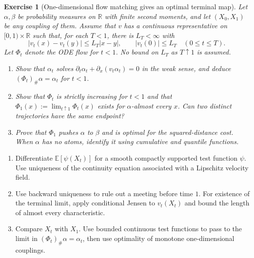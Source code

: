 \documentclass[11pt,a4paper]{article}
\theoremstyle{exostyle}
\newtheorem{exercise}{Exercise}
\newcommand{\R}{\mathbb{R}}
\newcommand{\push}{\#}
\newcommand{\EE}{\mathbb{E}}
\begin{document}
\begin{exercise}[One-dimensional flow matching gives an optimal terminal map]\label{ex-fm-line}
Let $\alpha,\beta$ be probability measures on $\R$ with finite second
moments, and let $(X_0,X_1)$ be any coupling of them.
Assume that $v$ has a continuous representative on $[0,1)\times\R$ such
that, for each $T<1$, there is $L_T<\infty$ with
\[
  |v_t(x)-v_t(y)|\leq L_T|x-y|,\qquad |v_t(0)|\leq L_T
  \quad (0\leq t\leq T).
\]
Let $\Phi_t$ denote the ODE flow for $t<1$. No bound on $L_T$ as
$T\uparrow1$ is assumed.
\begin{enumerate}[label=(\alph*)]
\item Show that $\alpha_t$ solves
  $\partial_t\alpha_t+\partial_x(v_t\alpha_t)=0$ in the weak sense,
  and deduce $(\Phi_t)_\push\alpha=\alpha_t$ for $t<1$.
\item Show that $\Phi_t$ is strictly increasing for $t<1$ and that
  $\Phi_1(x):=\lim_{t\uparrow1}\Phi_t(x)$ exists for $\alpha$-almost
  every $x$. Can two distinct trajectories have the same endpoint?
\item Prove that $\Phi_1$ pushes $\alpha$ to $\beta$ and is optimal for
  the squared-distance cost. When $\alpha$ has no atoms, identify it
  using cumulative and quantile functions.
\end{enumerate}
\end{exercise}
\begin{hints}
\begin{enumerate}[label=(\alph*)]
\item Differentiate $\EE[\psi(X_t)]$ for a smooth compactly supported
  test function $\psi$. Use uniqueness of the continuity equation
  associated with a Lipschitz velocity field.
\item Use backward uniqueness to rule out a meeting before time $1$.
  For existence of the terminal limit, apply conditional Jensen to
  $v_t(X_t)$ and bound the length of almost every characteristic.
\item Compare $X_t$ with $X_1$. Use bounded continuous test functions
  to pass to the limit in $(\Phi_t)_\push\alpha=\alpha_t$, then use
  optimality of monotone one-dimensional couplings.
\end{enumerate}
\end{hints}
\end{document}
